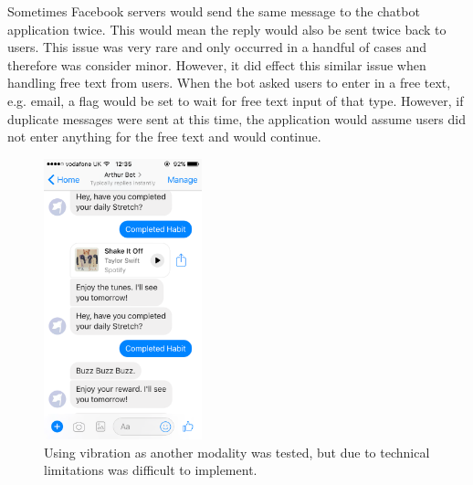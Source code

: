 Sometimes Facebook servers would send the same message to the chatbot application twice. This would mean the reply would also be sent twice back to users. This issue was very rare and only occurred in a handful of cases and therefore was consider minor. However, it did effect this similar issue when handling free text from users. When the bot asked users to enter in a free text, e.g. email, a flag would be set to wait for free text input of that type. However, if duplicate messages were sent at this time, the application would assume users did not enter anything for the free text and would continue.

\begin{figure}[H]
    \centering
    \includegraphics[width=1.8in]{../resources/design/vibration-reward.png}
    \caption{Using vibration as another modality was tested, but due to technical limitations was difficult to implement.}
    \label{fig:vibration_reward_issue}
\end{figure}

